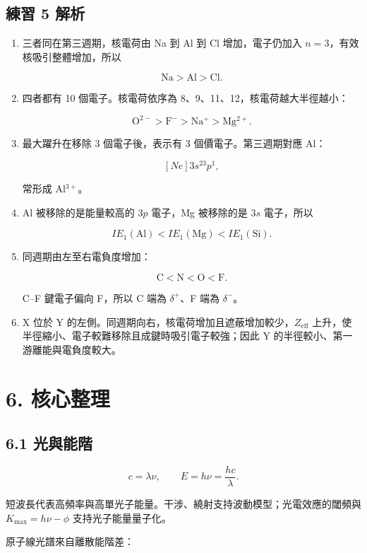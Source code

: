 \documentclass[11pt,a4paper]{article}
\begin{document}
\subsection{練習 5 解析}\label{ux7df4ux7fd2-5-ux89e3ux6790}

\begin{enumerate}
\def\labelenumi{\arabic{enumi}.}
\item
  三者同在第三週期，核電荷由 Na 到 Al 到 Cl 增加，電子仍加入 \(n=3\)，有效核吸引整體增加，所以

  \[
  \mathrm{Na>Al>Cl}.
  \]
\item
  四者都有 10 個電子。核電荷依序為 8、9、11、12，核電荷越大半徑越小：

  \[
  \mathrm{O^{2-}>F^->Na^+>Mg^{2+}}.
  \]
\item
  最大躍升在移除 3 個電子後，表示有 3 個價電子。第三週期對應 Al：

  \[
  [Ne]3s^23p^1,
  \]

  常形成 Al\(^{3+}\)。
\item
  Al 被移除的是能量較高的 \(3p\) 電子，Mg 被移除的是 \(3s\) 電子，所以

  \[
  IE_1(\mathrm{Al})<IE_1(\mathrm{Mg})<IE_1(\mathrm{Si}).
  \]
\item
  同週期由左至右電負度增加：

  \[
  \mathrm{C<N<O<F}.
  \]

  C--F 鍵電子偏向 F，所以 C 端為 \(\delta^+\)、F 端為 \(\delta^-\)。
\item
  X 位於 Y 的左側。同週期向右，核電荷增加且遮蔽增加較少，\(Z_{\mathrm{eff}}\) 上升，使半徑縮小、電子較難移除且成鍵時吸引電子較強；因此 Y 的半徑較小、第一游離能與電負度較大。
\end{enumerate}

\section{6. 核心整理}\label{ux6838ux5fc3ux6574ux7406}

\subsection{6.1 光與能階}\label{ux5149ux8207ux80fdux968e}

\[
c=\lambda\nu,
\qquad
E=h\nu=\frac{hc}{\lambda}.
\]

短波長代表高頻率與高單光子能量。干涉、繞射支持波動模型；光電效應的閾頻與 \(K_{\max}=h\nu-\phi\) 支持光子能量量子化。

原子線光譜來自離散能階差：
\end{document}
